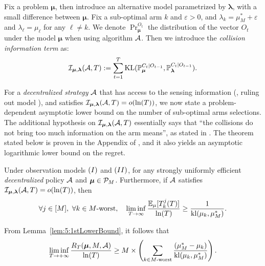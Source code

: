 Fix a problem $\bm{\mu}$,
then introduce an alternative model parametrized by $\bm{\lambda}$, with a small difference between $\bm{\mu}$.
Fix a sub-optimal arm $k$ and $\varepsilon>0$, and $\lambda_k = \mu^*_M + \varepsilon$ and $\lambda_{\ell} = \mu_{\ell}$ for any $\ell\neq k$.
We denote $\Pr_{\bm{\mu}}^{O_t}$ the distribution of the vector $O_t$ under the model $\bm{\mu}$ when using algorithm $\mathcal{A}$.
Then we introduce the \emph{collision information term} as:
\begin{equation}\label{eq:5:collisionInformationTerm}
  \mathcal{I}_{\bm{\mu},\bm{\lambda}}(\mathcal{A},T) := \sum_{t=1}^{T} \mathrm{KL}(\mathbb{P}_{\bm{\mu}}^{C_t | O_{t-1}}, \mathbb{P}_{\bm{\lambda}}^{C_t | O_{t-1}}).
\end{equation}

For a \emph{decentralized strategy} $\mathcal{A}$ that has access to the sensing information (\ie, ruling out model \modeltrois), and satisfies $\mathcal{I}_{\bm{\mu},\bm{\lambda}}(\mathcal{A},T) = \mathop{}\mathopen{}o\mathopen{}\left(\ln(T)\right)$,
we now state a problem-dependent asymptotic lower bound on the number of sub-optimal arms selections.
The additional hypothesis on $\mathcal{I}_{\bm{\mu},\bm{\lambda}}(\mathcal{A},T)$ essentially says that ``the collisions do not bring too much information on the arm means'', as stated in \cite{KaufmannAbbas19}.
The theorem stated below is proven in the Appendix of \cite{Besson2018ALT},
and it also yields an asymptotic logarithmic lower bound on the regret.

\begin{theorem}\label{thm:5:BetterLowerBound}
\begin{leftbar}[theorembar]  %
  Under observation models $(I)$ and $(II)$, for any strongly uniformly efficient \emph{decentralized} policy $\mathcal{A}$ and $\boldsymbol{\mu}\in\mathcal{P}_M$.
  Furthermore, if $\mathcal{A}$ satisfies $\mathcal{I}_{\bm{\mu},\bm{\lambda}}(\mathcal{A},T) = \mathop{}\mathopen{}o\mathopen{}\left(\ln(T)\right)$, then
  \begin{equation}\label{eq:5:LBDraws}
    \forall j \in [M], \ \forall k \in M\text{-}\mathrm{worst}, \ \ \ \liminf_{T\to \infty} \frac{\mathbb{E}_{\mu}[T_k^j(T)]}{\ln(T)} \geq \frac{1}{\mathrm{kl}(\mu_k, \mu_M^*)}.
  \end{equation}

  \noindent From Lemma~\ref{lem:5:1stLowerBound}, it follows that
  \begin{equation}\label{eq:5:ourLowerBound}
    \mathop{\lim\inf}\limits_{T \to +\infty} \frac{R_T(\boldsymbol{\mu}, M, \mathcal{A})}{\ln(T)}
    \geq M \times \left( \sum_{k \in M\text{-}\mathrm{worst}} \frac{(\mu_M^* -  \mu_k)}{\mathrm{kl}(\mu_k, \mu_M^*)} \right) .
  \end{equation}
\end{leftbar}  %
\end{theorem}



